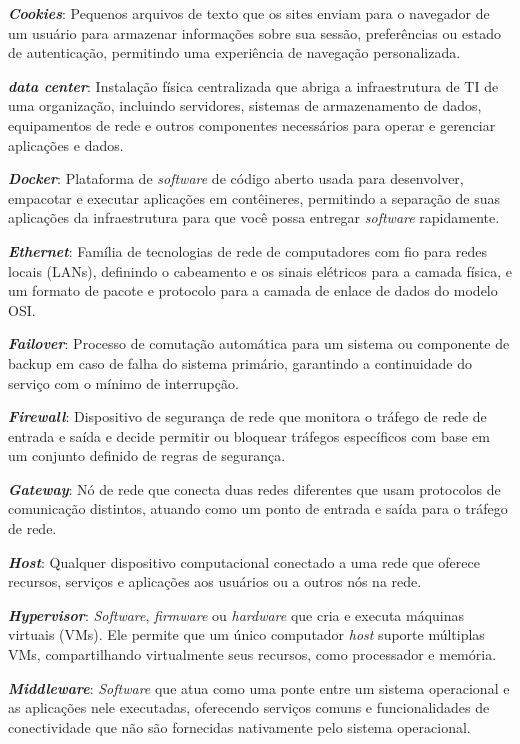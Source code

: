 {\textbf{\textit{Cookies}}: Pequenos arquivos de texto que os sites enviam para o navegador de um usuário para armazenar informações sobre sua sessão, preferências ou estado de autenticação, permitindo uma experiência de navegação personalizada.

\textbf{\textit{data center}}: Instalação física centralizada que abriga a infraestrutura de TI de uma organização, incluindo servidores, sistemas de armazenamento de dados, equipamentos de rede e outros componentes necessários para operar e gerenciar aplicações e dados.

\textbf{\textit{Docker}}: Plataforma de \textit{software} de código aberto usada para desenvolver, empacotar e executar aplicações em contêineres, permitindo a separação de suas aplicações da infraestrutura para que você possa entregar \textit{software} rapidamente.

\textbf{\textit{Ethernet}}: Família de tecnologias de rede de computadores com fio para redes locais (LANs), definindo o cabeamento e os sinais elétricos para a camada física, e um formato de pacote e protocolo para a camada de enlace de dados do modelo OSI.

\textbf{\textit{Failover}}: Processo de comutação automática para um sistema ou componente de backup em caso de falha do sistema primário, garantindo a continuidade do serviço com o mínimo de interrupção.

\textbf{\textit{Firewall}}: Dispositivo de segurança de rede que monitora o tráfego de rede de entrada e saída e decide permitir ou bloquear tráfegos específicos com base em um conjunto definido de regras de segurança.

\textbf{\textit{Gateway}}: Nó de rede que conecta duas redes diferentes que usam protocolos de comunicação distintos, atuando como um ponto de entrada e saída para o tráfego de rede.

\textbf{\textit{Host}}: Qualquer dispositivo computacional conectado a uma rede que oferece recursos, serviços e aplicações aos usuários ou a outros nós na rede.

\textbf{\textit{Hypervisor}}: \textit{Software}, \textit{firmware} ou \textit{hardware} que cria e executa máquinas virtuais (VMs). Ele permite que um único computador \textit{host} suporte múltiplas VMs, compartilhando virtualmente seus recursos, como processador e memória.

\textbf{\textit{Middleware}}: \textit{Software} que atua como uma ponte entre um sistema operacional e as aplicações nele executadas, oferecendo serviços comuns e funcionalidades de conectividade que não são fornecidas nativamente pelo sistema operacional.

}
